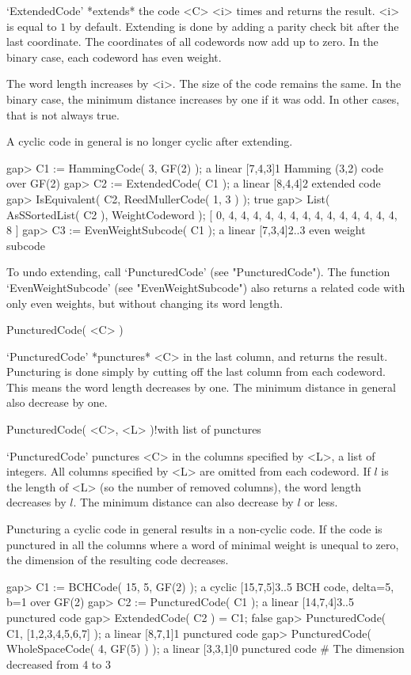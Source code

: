 `ExtendedCode'  *extends* the    code <C>   <i> times   and  returns  the
result. <i> is  equal to $1$ by default.  Extending is  done by adding  a
parity check bit  after  the  last coordinate.  The coordinates   of  all
codewords now add up to zero. In the binary case,  each codeword has even
weight.

The word  length increases  by  <i>. The   size of the  code remains  the
same. In the binary case, the minimum distance increases by one if it was
odd. In other cases, that is not always true.

A cyclic code in general is no longer cyclic after extending.

\beginexample
gap> C1 := HammingCode( 3, GF(2) );
a linear [7,4,3]1 Hamming (3,2) code over GF(2)
gap> C2 := ExtendedCode( C1 );
a linear [8,4,4]2 extended code
gap> IsEquivalent( C2, ReedMullerCode( 1, 3 ) );
true
gap> List( AsSSortedList( C2 ), WeightCodeword );
[ 0, 4, 4, 4, 4, 4, 4, 4, 4, 4, 4, 4, 4, 4, 4, 8 ]
gap> C3 := EvenWeightSubcode( C1 );
a linear [7,3,4]2..3 even weight subcode 
\endexample

To  undo  extending,  call   `PuncturedCode' (see  "PuncturedCode").  The
function `EvenWeightSubcode' (see  "EvenWeightSubcode")  also  returns  a
related  code with   only even  weights, but  without   changing its word
length.

\>PuncturedCode( <C> )

`PuncturedCode'  *punctures*  <C> in  the  last column,   and returns the
result. Puncturing  is done simply  by cutting  off the last  column from
each codeword. This means  the word length  decreases by one. The minimum
distance in general also decrease by one.

\>PuncturedCode( <C>, <L> )!{with list of punctures}

`PuncturedCode' punctures <C> in the columns specified  by <L>, a list of
integers.  All columns specified by  <L> are  omitted from each codeword.
If $l$ is the length of <L> (so the number of  removed columns), the word
length decreases by $l$. The minimum distance can also decrease by $l$ or
less.

Puncturing a cyclic code in general results in  a non-cyclic code. If the
code is  punctured in all the  columns where a  word of minimal weight is
unequal to zero, the dimension of the resulting code decreases.

\beginexample
gap> C1 := BCHCode( 15, 5, GF(2) );
a cyclic [15,7,5]3..5 BCH code, delta=5, b=1 over GF(2)
gap> C2 := PuncturedCode( C1 );
a linear [14,7,4]3..5 punctured code
gap> ExtendedCode( C2 ) = C1;
false
gap> PuncturedCode( C1, [1,2,3,4,5,6,7] );
a linear [8,7,1]1 punctured code
gap> PuncturedCode( WholeSpaceCode( 4, GF(5) ) );
a linear [3,3,1]0 punctured code  # The dimension decreased from 4 to 3 
\endexample

